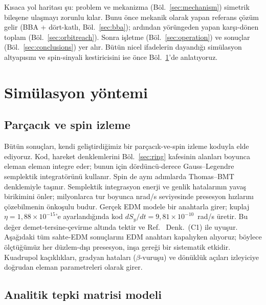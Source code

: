 \documentclass[aps,prab,reprint,superscriptaddress,nofootinbib]{revtex4-2}
\begin{document}
Kısaca yol haritası şu: problem ve mekanizma (Böl.~\ref{sec:mechanism}) simetrik
bileşene ulaşmayı zorunlu kılar. Bunu önce mekanik olarak yapan referans çözüm gelir
(BBA + dört-katlı, Böl.~\ref{sec:bba}); ardından yörüngeden yapan karşı-dönen toplam
(Böl.~\ref{sec:orbitreach}). Sonra işletme (Böl.~\ref{sec:operation}) ve sonuçlar
(Böl.~\ref{sec:conclusions}) yer alır. Bütün nicel ifadelerin dayandığı simülasyon
altyapısını ve spin-sinyali kestiricisini ise önce Böl.~\ref{sec:method}'de
anlatıyoruz.


\section{Simülasyon yöntemi}
\label{sec:method}

\subsection{Parçacık ve spin izleme}
\label{sec:tracking}

Bütün sonuçları, kendi geliştirdiğimiz bir parçacık-ve-spin izleme koduyla elde
ediyoruz. Kod, hareket denklemlerini Böl.~\ref{sec:ring} kafesinin alanları boyunca
eleman eleman integre eder; bunun için dördüncü-derece Gauss--Legendre semplektik
integratörünü kullanır. Spin de aynı adımlarda Thomas--BMT denklemiyle taşınır.
Semplektik integrasyon enerji ve genlik hatalarının yavaş birikimini önler;
milyonlarca tur boyunca nrad/s seviyesinde presesyon hızlarını çözebilmenin önkoşulu
budur. Gerçek EDM modele bir anahtarla girer; kuplaj $\eta = 1{,}88\times10^{-15}$'e
ayarlandığında kod $dS_y/dt = 9{,}81\times10^{-10}$~rad/s üretir. Bu değer
demet-tersine-çevirme altında tektir ve Ref.~\cite{omarov} Denk.~(C1) ile uyuşur.
Aşağıdaki tüm sahte-EDM sonuçlarını EDM anahtarı kapalıyken alıyoruz; böylece
ölçtüğümüz her düzlem-dışı presesyon, inşa gereği bir sistematik etkidir. Kuadrupol
kaçıklıkları, gradyan hataları ($\beta$-vuruşu) ve dönüklük açıları izleyiciye
doğrudan eleman parametreleri olarak girer.

\subsection{Analitik tepki matrisi modeli}
\label{sec:responsemodel}
\end{document}
